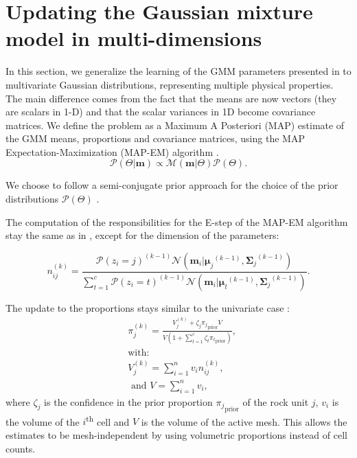 \section{Updating the Gaussian mixture model in multi-dimensions} \label{UpdateTheta}

In this section, we generalize the learning of the GMM parameters presented in \citet{ggz389} to multivariate Gaussian distributions, representing multiple physical properties. The main difference comes from the fact that the means are now vectors (they are scalars in 1-D) and that the scalar variances in 1D become covariance matrices. We define the problem as a Maximum A Posteriori (MAP) estimate of the GMM means, proportions and covariance matrices, using the MAP Expectation-Maximization (MAP-EM) algorithm \citep{ExpectationMaximization}.
\begin{equation}
\mathcal{P}(\Theta|\mathbf{m}) \propto \mathcal{M}(\mathbf{m}|\Theta)\mathcal{P}(\Theta).
\label{theta_posterior}
\end{equation}

We choose to follow a semi-conjugate prior approach for the choice of the prior distributions $\mathcal{P}(\Theta)$ \citep{ggz389, Murphy2012}.

The computation of the responsibilities for the E-step of the MAP-EM algorithm stay the same as in \citet{ggz389}, except for the dimension of the parameters:

\begin{equation}
n_{ij}^{(k)} = \frac{\mathcal{P}(z_i=j)^{(k-1)}\mathcal{N}(\mathbf{m}_i|{\mathbf{\mu}_j}^{(k-1)}, {\mathbf{\Sigma}_j}^{(k-1)})}{ \sum_{t=1}^c \mathcal{P}(z_i=t)^{(k-1)} \mathcal{N}({\mathbf{m}}_i|{\mathbf{\mu}_t}^{(k-1)}, {\mathbf{\Sigma}_j}^{(k-1)})} \label{eq:responsibilities}.
\end{equation}

The update to the proportions stays similar to the univariate case \citep{ggz389}:
\begin{align}
&{\pi}^{(k)}_j = \frac{V_{j}^{(k)}+\zeta_j {{\pi}_j}_{\text{prior}}V}{V(1+\sum_{t=1}^c \zeta_t {{\pi}_t}_{\text{prior}})} \label{eq:pi_update}, \\
&\text{with:} \nonumber\\
&V_{j}^{(k)} = \sum^n_{i=1} v_i n_{ij}^{(k)}, \label{VolumeProportions}\\
&\text{ and } V=\sum^n_{i=1} v_i,
\end{align}
where $\zeta_j$ is the confidence in the prior proportion ${\pi_j}_{\text{prior}}$ of the rock unit $j$, $v_i$ is the volume of the $i$\textsuperscript{th} cell and $V$ is the volume of the
active mesh. This allows the estimates to be mesh-independent by using volumetric proportions instead of cell counts.

